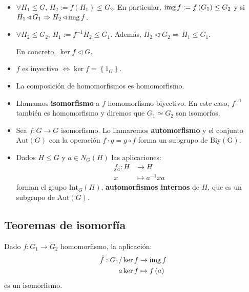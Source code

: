     \begin{obs}
        \begin{itemize}
        \item $\forall H_1 \le G$, $H_2 := f\left( H_1 \right) \le G_2$. En particular, $\operatorname{img} f := f\left( G_1 \right) \le G_2$ y si $H_1 \triangleleft G_1 \Rightarrow H_2 \triangleleft \operatorname{img} f$.
        \item $\forall H_2 \le G_2$, $H_1 := f^{-1} H_2 \le G_1$. Además, $H_2 \triangleleft G_2 \Rightarrow H_1 \le G_1$.

        En concreto, $\ker f \triangleleft G$.

        \item $f$ es inyectivo $\Leftrightarrow \ker f = \left\{ 1_G \right\}$.

        \item La composición de homomorfismos es homomorfismo.
            
        \item Llamamos \textbf{isomorfismo} a $f$ homomorfismo biyectivo. En este caso, $f^{-1}$ también es homomorfismo y diremos que $G_1 \simeq G_2$ son isomorfos.
        \end{itemize}
    \end{obs}

    \begin{ej}
        \begin{itemize}
        \item Sea $f: G \rightarrow G$ isomorfismo. Lo llamaremos \textbf{automorfismo} y el conjunto $\mathrm{Aut}\left( G \right)$ con la operación $f \cdot g = g \circ f$ forma un subgrupo de $\mathrm{Biy\left( G \right)}$.

        \item Dados $H \le G$ y $a \in N_G\left( H \right)$ las aplicaciones:
        \begin{align*}
            f_a : H &\rightarrow H\\
            x &\mapsto a^{-1} x a
        \end{align*}
        forman el grupo $\mathrm{Int}_G\left( H \right)$, \textbf{automorfismos internos} de $H$, que es un subgrupo de $\mathrm{Aut}\left( G \right)$.
        \end{itemize}
    \end{ej}

\subsection{Teoremas de isomorfía}
    \begin{theo}
        Dado $f: G_1 \rightarrow G_2$ homomorfismo, la aplicación:
        \begin{align*}
            \hat{f}: G_1 / \ker f &\rightarrow \operatorname{img} f\\
            a \ker f &\mapsto f\left( a \right)
        \end{align*}
        es un isomorfismo.
    \end{theo}

